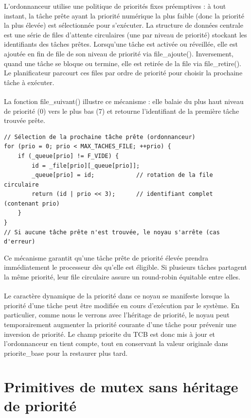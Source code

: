 \documentclass{latexPackage/utc-report/utc-report}
\begin{document}
L’ordonnanceur utilise une politique de priorités fixes préemptives : à tout instant, la tâche prête ayant la priorité numérique la plus faible (donc la priorité la plus élevée) est sélectionnée pour s’exécuter. La structure de données centrale est une série de files d’attente circulaires (une par niveau de priorité) stockant les identifiants des tâches prêtes. Lorsqu’une tâche est activée ou réveillée, elle est ajoutée en fin de file de son niveau de priorité via file\_ajoute(). Inversement, quand une tâche se bloque ou termine, elle est retirée de la file via file\_retire(). Le planificateur parcourt ces files par ordre de priorité pour choisir la prochaine tâche à exécuter.
\\\\
La fonction file\_suivant() illustre ce mécanisme : elle balaie du plus haut niveau de priorité (0) vers le plus bas (7) et retourne l’identifiant de la première tâche trouvée prête.

\begin{verbatim}
// Sélection de la prochaine tâche prête (ordonnanceur)
for (prio = 0; prio < MAX_TACHES_FILE; ++prio) {
    if (_queue[prio] != F_VIDE) {
        id = _file[prio][_queue[prio]];
        _queue[prio] = id;            // rotation de la file circulaire
        return (id | prio << 3);      // identifiant complet (contenant prio)
    }
}
// Si aucune tâche prête n'est trouvée, le noyau s'arrête (cas d'erreur)
\end{verbatim}

Ce mécanisme garantit qu’une tâche prête de priorité élevée prendra immédiatement le processeur dès qu’elle est éligible. Si plusieurs tâches partagent la même priorité, leur file circulaire assure un round-robin équitable entre elles.
\\\\
Le caractère dynamique de la priorité dans ce noyau se manifeste lorsque la priorité d’une tâche peut être modifiée en cours d’exécution par le système. En particulier, comme nous le verrons avec l’héritage de priorité, le noyau peut temporairement augmenter la priorité courante d’une tâche pour prévenir une inversion de priorité. Le champ priorite du TCB est donc mis à jour et l’ordonnanceur en tient compte, tout en conservant la valeur originale dans priorite\_base pour la restaurer plus tard.

\pagebreak

\section{Primitives de mutex sans héritage de priorité}
\end{document}

